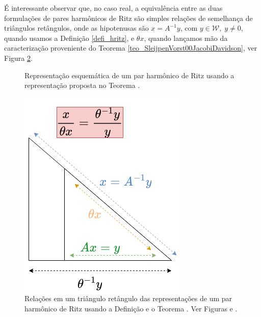 \'{E} interessante observar que, no caso real, a equivalência entre as duas formulaç\~{o}es de pares harmônicos de Ritz são simples relaç\~{o}es de semelhança de triângulos retângulos, onde as hipotenusas são $x=A^{-1}y$, com $y \in\mathcal{W},\;y\ne0$,  quando usamos a Definição \ref{defi_hritz}, e $\theta x$, quando lançamos mão da caracterização proveniente do Teorema \ref{teo_SleijpenVorst00JacobiDavidson}, ver Figura \ref{fig_hritzpairtriang}.
\begin{figure}[htb]
  \caption{Representação esquemática de um par harmônico de Ritz usando a representação proposta no Teorema \protect{\ref{teo_SleijpenVorst00JacobiDavidson}}.}\label{fig_hritzpair}
\end{figure}

\begin{figure}[htb]
  \begin{center}
  \includegraphics[scale=.7]{Figures/triangret.png}
  \caption{ Relações em um triângulo retângulo das representações de um par harmônico de Ritz usando a Definição \protect{\ref{defi_hritz}} e o Teorema \protect{\ref{teo_SleijpenVorst00JacobiDavidson}}. Ver Figuras \protect{\ref{fig_hritzpairorig}} e \protect{\ref{fig_hritzpair}}.}\label{fig_hritzpairtriang}
  \end{center}

\end{figure}
